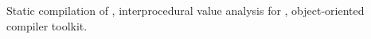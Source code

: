 Static compilation of \matlab, interprocedural value analysis for \matlab,
object-oriented compiler toolkit.
